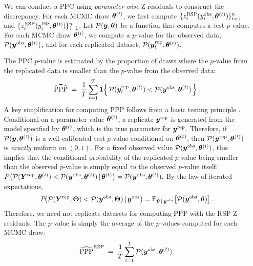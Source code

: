 We can conduct a PPC using \emph{parameter-wise} Z-residuals to construct the discrepancy. For each MCMC draw $\bm{\theta}^{(t)}$, we first compute $ \{ z_i^{\text{RSP}}(y_i^{\text{obs}},\bm{\theta}^{(t)}) \}_{i=1}^n$ and $ \{ z_i^{\text{RSP}}(y_i^{\text{rep}},\bm{\theta}^{(t)}) \}_{i=1}^n$. Let $\mathcal{P}(\bm{y}, \bm{\theta})$ be a function that computes a test $p$-value. For each MCMC draw $\bm{\theta}^{(t)}$, we compute a $p$-value for the observed data, $\mathcal{P}(\bm{y}^{\text{obs}},\bm{\theta}^{(t)})$, and for each replicated dataset, $\mathcal{P}(\bm{y}_t^{\text{rep}},\bm{\theta}^{(t)})$.

The PPC $p$-value is estimated by the proportion of draws where the $p$-value from the replicated data is smaller than the $p$-value from the observed data:
\begin{equation}
\widehat{\text{PPP} }\;=\; \frac{1}{T}\sum_{t=1}^T \mathbf{1}\!\left\{\, \mathcal{P}(\bm{y}_t^{\text{rep}},\bm{\theta}^{(t)}) < \mathcal{P}(\bm{y}^{\text{obs}},\bm{\theta}^{(t)}) \,\right\}.
\label{eqn:ppp-rep}
\end{equation}
A key simplification for computing PPP follows from a basic testing principle  \citep{Meng1994}. Conditional on a parameter value $\bm{\theta}^{(t)}$, a replicate $\bm{y}^{\text{rep}}$ is generated from the model specified by $\bm{\theta}^{(t)}$, which is the true parameter for $\bm{y}^{\text{rep}}$. Therefore, if \(\mathcal{P}(\bm{y},\bm{\theta}^{(t)})\) is a well-calibrated test \(p\)-value conditional on \(\bm{\theta}^{(t)}\), then \(\mathcal{P}(\bm{y}^{\mathrm{rep}},\bm{\theta}^{(t)})\) is \textit{exactly} uniform on \((0,1)\). For a fixed observed value \(\mathcal{P}(\bm{y}^{\mathrm{obs}},\bm{\theta}^{(t)})\), this implies that the conditional probability of the replicated $p$-value being smaller than the observed $p$-value is simply equal to the observed $p$-value itself:
$P\big(\mathcal{P}(\bm{Y}^{\text{rep}},\bm{\theta}^{(t)}) < \mathcal{P}(\bm{y}^{\text{obs}},\bm{\theta}^{(t)})\,|\, \bm{\theta}^{(t)}\big) = \mathcal{P}(\bm{y}^{\text{obs}},\bm{\theta}^{(t)}).$
By the law of iterated expectations,
\begin{equation}
P\!\big(\mathcal{P}(\bm{Y}^{\text{rep}},\bm{\Theta}) < \mathcal{P}(\bm{y}^{\text{obs}},\bm{\Theta}) \,|\, \bm{y}^{\text{obs}}\big)
=\mathbb{E}_{\bm{\theta}\,|\, \bm{y}^{\text{obs}}}\!\left[\mathcal{P}(\bm{y}^{\text{obs}},\bm{\theta})\right].
\label{eqn:ppp-avg}
\end{equation}
Therefore, we need not replicate datasets for computing PPP with the RSP Z–residuals. The $p$-value is simply the average of the $p$-values computed for each MCMC draw:
\begin{equation}
\widehat{\text{PPP}}^{\text{RSP}} \;=\; \frac{1}{T}\sum_{t=1}^{T} \mathcal{P}(\bm{y}^{\text{obs}},\bm{\theta}^{(t)}).
\label{eq-ppp-zresd}
\end{equation}

